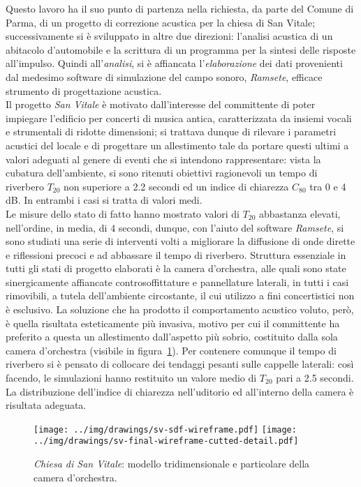 \documentclass[10pt,a4paper]{article}
\begin{document}
Questo lavoro ha il suo punto di partenza nella richiesta, da parte del Comune di Parma, di un progetto 
di correzione acustica per la chiesa di San Vitale; successivamente si \`e sviluppato in altre due
direzioni: l'analisi acustica di un abitacolo d'automobile e la scrittura di un programma per la
sintesi delle risposte all'impulso. Quindi all'\emph{analisi}, si \`e affiancata l'\emph{elaborazione}
dei dati provenienti dal medesimo software di simulazione del campo sonoro, \emph{Ramsete}, efficace
strumento di progettazione acustica.\\ 
Il progetto \emph{San Vitale} \`e motivato dall'interesse del committente di poter impiegare l'edificio
per concerti di musica antica, caratterizzata da insiemi vocali e strumentali di ridotte dimensioni; si
trattava dunque di rilevare i parametri acustici del locale e di progettare un allestimento tale da 
portare questi ultimi a valori adeguati al genere di eventi che si intendono rappresentare: vista la cubatura
dell'ambiente, si sono ritenuti obiettivi ragionevoli un tempo di riverbero $T_{20}$ non superiore
a 2.2 secondi ed un indice di chiarezza $C_{80}$ tra 0 e 4 dB. In entrambi i casi si tratta di valori medi.\\
Le misure dello stato di fatto hanno mostrato valori di $T_{20}$ abbastanza elevati, nell'ordine, in media, 
di 4 secondi, dunque,
con l'aiuto del software \emph{Ramsete}, si sono studiati una serie di interventi volti a migliorare la
diffusione di onde dirette e riflessioni precoci e ad abbassare il tempo di riverbero. Struttura essenziale
in tutti gli stati di progetto elaborati \`e la camera d'orchestra, alle quali sono state sinergicamente affiancate 
controsoffittature e pannellature laterali, in tutti i casi rimovibili, a tutela dell'ambiente circostante,
il cui utilizzo a fini concertistici non \`e esclusivo. La soluzione che ha prodotto il comportamento 
acustico voluto, per\`o, \`e quella risultata esteticamente pi\`u invasiva, motivo per cui il committente 
ha preferito a questa un allestimento dall'aspetto pi\`u sobrio, costituito dalla sola camera d'orchestra
(visibile in figura~\ref{fig:churchmodel}). 
Per contenere comunque il tempo di riverbero si \`e pensato di collocare dei tendaggi pesanti sulle cappelle 
laterali: cos\`i facendo, le simulazioni hanno restituito un valore medio di $T_{20}$ pari a 2.5 secondi. La
distribuzione dell'indice di chiarezza nell'uditorio ed all'interno della camera \`e risultata adeguata.\\
%
\begin{figure}[htbp]
  \centering
  \texttt{[image: ../img/drawings/sv-sdf-wireframe.pdf]}
  \texttt{[image: ../img/drawings/sv-final-wireframe-cutted-detail.pdf]}
  \caption{\emph{Chiesa di San Vitale}: modello tridimensionale e particolare della camera d'orchestra.}
  \label{fig:churchmodel}
\end{figure}
\end{document}
